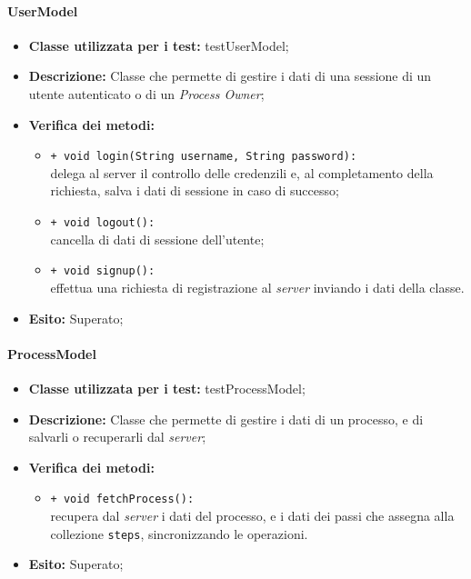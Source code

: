 \paragraph{UserModel}
\begin{flushleft}
\begin{itemize}
\item \textbf{Classe utilizzata per i test:} testUserModel;
\item \textbf{Descrizione:} Classe che permette di gestire i dati di una sessione di un utente autenticato o di un \textit{Process Owner};
\item \textbf{Verifica dei metodi:}
\begin{sloppypar}
\begin{itemize}
\item \texttt{+ void login(String username, String password):}\\ delega al server il controllo delle credenzili e, al completamento della richiesta, salva i dati di sessione in caso di successo;
\item \texttt{+ void logout():}\\ cancella di dati di sessione dell'utente;
\item \texttt{+ void signup():}\\ effettua una richiesta di registrazione al \textit{server} inviando i dati della classe.
\end{itemize}
\end{sloppypar}
\item \textbf{Esito:} Superato;
\end{itemize}
\end{flushleft}

\paragraph{ProcessModel}
\begin{flushleft}
\begin{itemize}
\item \textbf{Classe utilizzata per i test:} testProcessModel;
\item \textbf{Descrizione:} Classe che permette di gestire i dati di un processo, e di salvarli o recuperarli dal \textit{server};
\item \textbf{Verifica dei metodi:}
\begin{sloppypar}
\begin{itemize}
\item \texttt{+ void fetchProcess():}\\ recupera dal \textit{server} i dati del processo, e i dati dei passi che assegna alla collezione \texttt{steps}, sincronizzando le operazioni.
\end{itemize}
\end{sloppypar}
\item \textbf{Esito:} Superato;
\end{itemize}
\end{flushleft}

